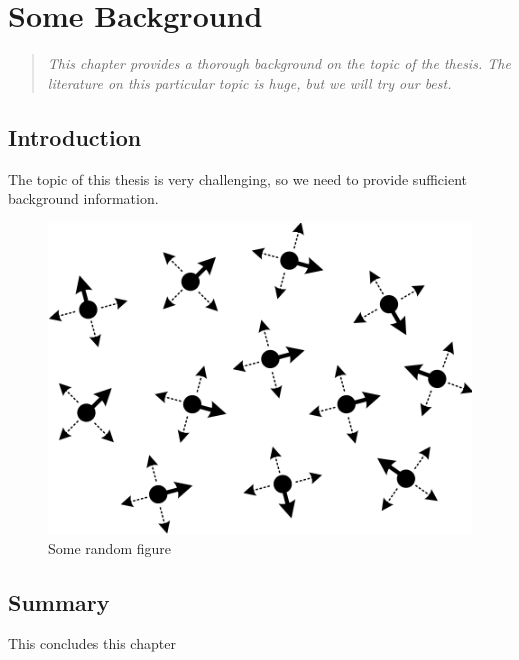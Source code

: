 \chapter{Some Background}\label{chap:background}

\minitoc %

\begin{quote}
{\it This chapter provides a thorough background on the topic of the thesis. The literature on this particular topic is huge, but we will try our best.}
\end{quote}

\section{Introduction}\label{chap:background:introduction}

The topic of this thesis is very challenging, so we need to provide sufficient background information.

\begin{figure}[!h] 
	\centering
	\includegraphics[scale=0.7]{images/fig01.png}
	\caption{Some random figure}
	\label{fig:background:random}
\end{figure}

\section{Summary}\label{chap:background:summary}
This concludes this chapter

